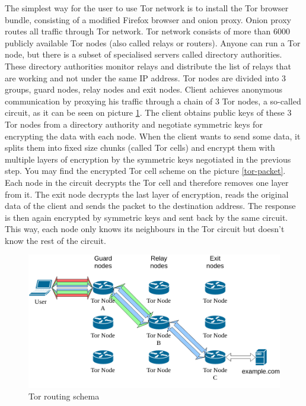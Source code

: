 \documentclass[
  digital, %
  table,   %
  lof,     %
  lot,     %
  oneside
]{fithesis3}
\begin{document}
The simplest way for the user to use Tor network is to install the Tor browser bundle, consisting of
a modified Firefox browser and onion proxy. Onion proxy routes all traffic through Tor network.
Tor network consists of more than 6000 publicly available Tor nodes (also called relays or routers).
Anyone can run a Tor node, but there is a subset of specialised servers called directory authorities.
These directory authorities monitor relays and distribute the list of relays that are working and 
not under the same IP address.
Tor nodes are divided into 3 groups, guard nodes, relay nodes and exit nodes.
Client achieves anonymous communication by proxying his traffic through
a chain of 3 Tor nodes, a so-called circuit, as it can be seen on picture \ref{tor}.
The client obtains public keys of these 3 Tor nodes from a directory authority and negotiate
symmetric keys for encrypting the data with each node.
When the client wants to send some data, it splits them into fixed size chunks
(called Tor cells) and encrypt them with multiple layers of encryption by the symmetric keys negotiated in the previous step.
You may find the encrypted Tor cell scheme on the picture \ref{tor-packet}.
Each node in the circuit decrypts the Tor cell and therefore removes one layer from it.
The exit node decrypts the last layer of encryption, reads the original data of the client and sends the packet to the destination address. The response is then again encrypted by symmetric keys
and sent back by the same circuit.
This way, each node only knows its neighbours in the Tor circuit but doesn't know the rest of the circuit.
 
\begin{figure}[!htb]
    \centering
    \includegraphics[width=1\textwidth]{tor}
    \caption{Tor routing schema}
    \label{tor}
\end{figure}
 
\end{document}

